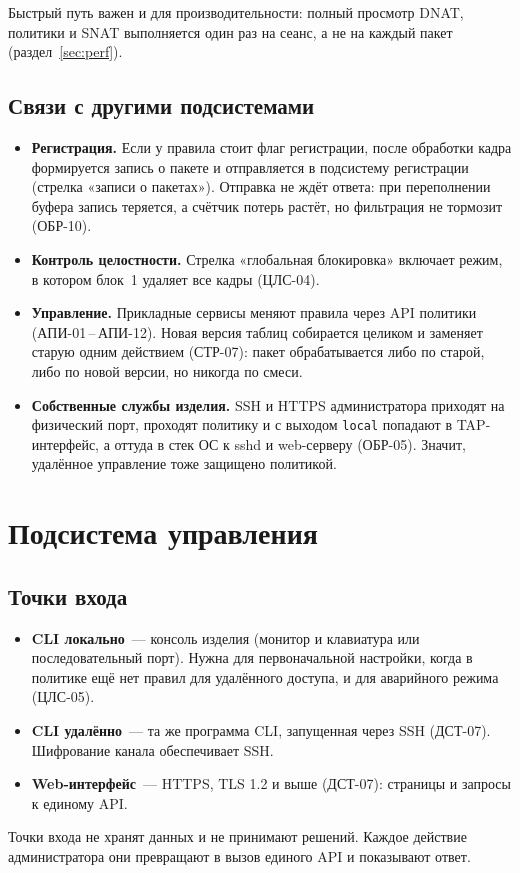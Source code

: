 \documentclass[12pt,a4paper,final]{article}
\begin{document}
Быстрый путь важен и для производительности: полный просмотр DNAT, политики
и SNAT выполняется один раз на сеанс, а не на каждый пакет
(раздел~\ref{sec:perf}).

\subsection{Связи с другими подсистемами}
\begin{itemize}
\item \textbf{Регистрация.} Если у правила стоит флаг регистрации, после
  обработки кадра формируется запись о пакете и отправляется в подсистему
  регистрации (стрелка «записи о пакетах»). Отправка не ждёт ответа: при
  переполнении буфера запись теряется, а счётчик потерь растёт, но фильтрация
  не тормозит (ОБР-10).
\item \textbf{Контроль целостности.} Стрелка «глобальная блокировка» включает
  режим, в котором блок~1 удаляет все кадры (ЦЛС-04).
\item \textbf{Управление.} Прикладные сервисы меняют правила через API
  политики (АПИ-01\,--\,АПИ-12). Новая версия таблиц собирается целиком
  и заменяет старую одним действием (СТР-07): пакет обрабатывается либо по
  старой, либо по новой версии, но никогда по смеси.
\item \textbf{Собственные службы изделия.} SSH и HTTPS администратора приходят
  на физический порт, проходят политику и с выходом \texttt{local} попадают
  в TAP-интерфейс, а оттуда в стек ОС к sshd и web-серверу (ОБР-05). Значит,
  удалённое управление тоже защищено политикой.
\end{itemize}

\section{Подсистема управления}\label{sec:mgmt}

\subsection{Точки входа}
\begin{itemize}
\item \textbf{CLI локально}~— консоль изделия (монитор и клавиатура или
  последовательный порт). Нужна для первоначальной настройки, когда в
  политике ещё нет правил для удалённого доступа, и для аварийного режима
  (ЦЛС-05).
\item \textbf{CLI удалённо}~— та же программа CLI, запущенная через SSH
  (ДСТ-07). Шифрование канала обеспечивает SSH.
\item \textbf{Web-интерфейс}~— HTTPS, TLS 1.2 и выше (ДСТ-07): страницы
  и запросы к единому API.
\end{itemize}
Точки входа не хранят данных и не принимают решений. Каждое действие
администратора они превращают в вызов единого API и показывают ответ.
\end{document}
